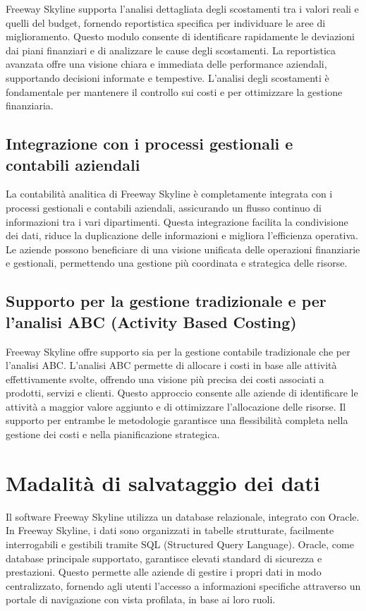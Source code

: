 \documentclass{article}
\begin{document}
Freeway Skyline supporta l'analisi dettagliata degli scostamenti tra i valori reali e quelli del budget, fornendo reportistica specifica per individuare le aree di miglioramento. Questo modulo consente di identificare rapidamente le deviazioni dai piani finanziari e di analizzare le cause degli scostamenti. La reportistica avanzata offre una visione chiara e immediata delle performance aziendali, supportando decisioni informate e tempestive. L'analisi degli scostamenti è fondamentale per mantenere il controllo sui costi e per ottimizzare la gestione finanziaria.

\subsection{Integrazione con i processi gestionali e contabili aziendali}

La contabilità analitica di Freeway Skyline è completamente integrata con i processi gestionali e contabili aziendali, assicurando un flusso continuo di informazioni tra i vari dipartimenti. Questa integrazione facilita la condivisione dei dati, riduce la duplicazione delle informazioni e migliora l'efficienza operativa. Le aziende possono beneficiare di una visione unificata delle operazioni finanziarie e gestionali, permettendo una gestione più coordinata e strategica delle risorse.

\subsection{Supporto per la gestione tradizionale e per l'analisi ABC (Activity Based Costing)}

Freeway Skyline offre supporto sia per la gestione contabile tradizionale che per l'analisi ABC. L'analisi ABC permette di allocare i costi in base alle attività effettivamente svolte, offrendo una visione più precisa dei costi associati a prodotti, servizi e clienti. Questo approccio consente alle aziende di identificare le attività a maggior valore aggiunto e di ottimizzare l'allocazione delle risorse. Il supporto per entrambe le metodologie garantisce una flessibilità completa nella gestione dei costi e nella pianificazione strategica.


\section{Madalità di salvataggio dei dati}
Il software Freeway Skyline utilizza un database relazionale, integrato con Oracle.\\
In Freeway Skyline, i dati sono organizzati in tabelle strutturate, facilmente interrogabili e gestibili tramite SQL (Structured Query Language). Oracle, come database principale supportato, garantisce elevati standard di sicurezza e prestazioni. Questo permette alle aziende di gestire i propri dati in modo centralizzato, fornendo agli utenti l'accesso a informazioni specifiche attraverso un portale di navigazione con vista profilata, in base ai loro ruoli.\\
\end{document}
